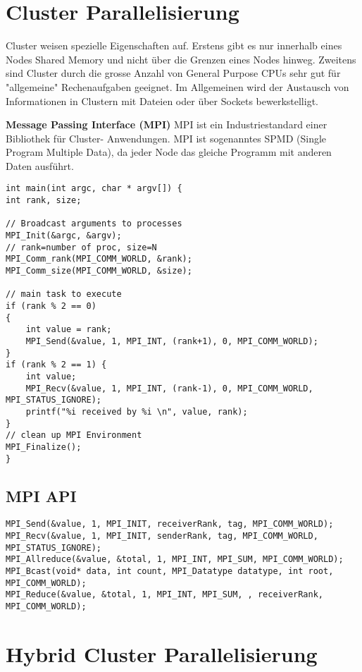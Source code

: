 \section{Cluster Parallelisierung}

Cluster weisen spezielle Eigenschaften auf. Erstens gibt es nur innerhalb eines Nodes Shared Memory und nicht über die Grenzen eines Nodes hinweg. Zweitens sind Cluster durch die grosse Anzahl von General Purpose CPUs sehr gut für "allgemeine" Rechenaufgaben geeignet. Im Allgemeinen wird der Austausch von Informationen in Clustern mit Dateien oder über Sockets bewerkstelligt.


\textbf{Message Passing Interface (MPI)}  MPI ist ein Industriestandard einer Bibliothek für Cluster- Anwendungen. MPI ist sogenanntes SPMD (Single Program Multiple Data), da jeder Node das gleiche Programm mit anderen Daten ausführt.

\begin{lstlisting}[style=csharp]
int main(int argc, char * argv[]) {
int rank, size;

// Broadcast arguments to processes
MPI_Init(&argc, &argv);
// rank=number of proc, size=N
MPI_Comm_rank(MPI_COMM_WORLD, &rank);
MPI_Comm_size(MPI_COMM_WORLD, &size);

// main task to execute
if (rank % 2 == 0) 
{
	int value = rank;
    MPI_Send(&value, 1, MPI_INT, (rank+1), 0, MPI_COMM_WORLD);
} 
if (rank % 2 == 1) {
    int value;
    MPI_Recv(&value, 1, MPI_INT, (rank-1), 0, MPI_COMM_WORLD, MPI_STATUS_IGNORE);
    printf("%i received by %i \n", value, rank);
}
// clean up MPI Environment
MPI_Finalize();
}
\end{lstlisting}

\subsection{MPI API}

\begin{lstlisting}[style=csharp]
MPI_Send(&value, 1, MPI_INIT, receiverRank, tag, MPI_COMM_WORLD);
MPI_Recv(&value, 1, MPI_INIT, senderRank, tag, MPI_COMM_WORLD, MPI_STATUS_IGNORE);
MPI_Allreduce(&value, &total, 1, MPI_INT, MPI_SUM, MPI_COMM_WORLD);
MPI_Bcast(void* data, int count, MPI_Datatype datatype, int root, MPI_COMM_WORLD);
MPI_Reduce(&value, &total, 1, MPI_INT, MPI_SUM, , receiverRank, MPI_COMM_WORLD);
\end{lstlisting}

\section{Hybrid Cluster Parallelisierung}

